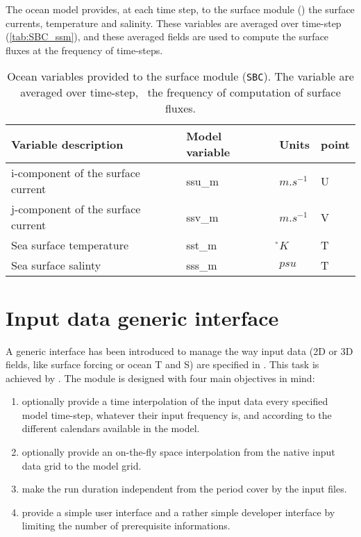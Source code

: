 \documentclass[../main/NEMO_manual]{subfiles}
\begin{document}
The ocean model provides, at each time step, to the surface module ()
the surface currents, temperature and salinity.
These variables are averaged over  time-step (\autoref{tab:SBC_ssm}), and
these averaged fields are used to compute the surface fluxes at the frequency of  time-steps.

\begin{table}[tb]
  \centering
  \begin{tabular}{|l|l|l|l|}
    \hline
    Variable description			                  & Model variable	& Units	& point                 \\
    \hline
    i-component of the surface current	& ssu\_m	              & $m.s^{-1}$	    & U     \\
    \hline
    j-component of the surface current	& ssv\_m	              & $m.s^{-1}$	    & V     \\
    \hline
    Sea surface temperature			         & sst\_m	              & \r{}$K$	             & T     \\\hline
    Sea surface salinty			                  & sss\_m	              & $psu$		        & T     \\	\hline
  \end{tabular}
  \caption[Ocean variables provided to the surface module)]{
    Ocean variables provided to the surface module (\texttt{SBC}).
    The variable are averaged over \protect{} time-step,
    \ie\ the frequency of computation of surface fluxes.}
  \label{tab:SBC_ssm}
\end{table}



\section{Input data generic interface}
\label{sec:SBC_input}

A generic interface has been introduced to manage the way input data
(2D or 3D fields, like surface forcing or ocean T and S) are specified in \NEMO.
This task is achieved by .
The module is designed with four main objectives in mind:
\begin{enumerate}
\item optionally provide a time interpolation of the input data every specified model time-step, whatever their input frequency is,
  and according to the different calendars available in the model.
\item optionally provide an on-the-fly space interpolation from the native input data grid to the model grid.
\item make the run duration independent from the period cover by the input files.
\item provide a simple user interface and a rather simple developer interface by
  limiting the number of prerequisite informations.
\end{enumerate}
\end{document}
